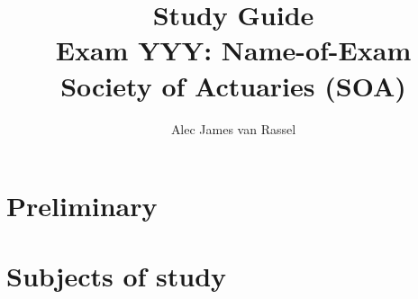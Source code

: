 \documentclass[12pt, titlepage, french]{report}
\title{
	Study Guide	\\
	\large Exam YYY: Name-of-Exam\\
	Society of Actuaries (SOA)
	}
\date{}
\author{Alec James van Rassel}
\begin{document}
\maketitle

\tableofcontents

\clearpage

\part*{Preliminary}



\part*{Subjects of study}



\newpage
\end{document}
